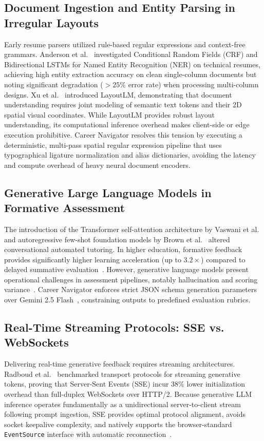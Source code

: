 \documentclass[conference]{IEEEtran}
\begin{document}
\subsection{Document Ingestion and Entity Parsing in Irregular Layouts}
Early resume parsers utilized rule-based regular expressions and context-free grammars. Anderson et al.~\cite{anderson2021automated} investigated Conditional Random Fields (CRF) and Bidirectional LSTMs for Named Entity Recognition (NER) on technical resumes, achieving high entity extraction accuracy on clean single-column documents but noting significant degradation ($> 25\%$ error rate) when processing multi-column designs. Xu et al.~\cite{xu2020layoutlm} introduced LayoutLM, demonstrating that document understanding requires joint modeling of semantic text tokens and their 2D spatial visual coordinates. While LayoutLM provides robust layout understanding, its computational inference overhead makes client-side or edge execution prohibitive. Career Navigator resolves this tension by executing a deterministic, multi-pass spatial regular expression pipeline that uses typographical ligature normalization and alias dictionaries, avoiding the latency and compute overhead of heavy neural document encoders.

\subsection{Generative Large Language Models in Formative Assessment}
The introduction of the Transformer self-attention architecture by Vaswani et al.~\cite{vaswani2017attention} and autoregressive few-shot foundation models by Brown et al.~\cite{brown2020language} altered conversational automated tutoring. In higher education, formative feedback provides significantly higher learning acceleration (up to $3.2\times$) compared to delayed summative evaluation~\cite{resnick2019formative}. However, generative language models present operational challenges in assessment pipelines, notably hallucination and scoring variance~\cite{bubeck2023sparks}. Career Navigator enforces strict JSON schema generation parameters over Gemini 2.5 Flash~\cite{geminiteam2023gemini, geminiteam2024gemini15}, constraining outputs to predefined evaluation rubrics.

\subsection{Real-Time Streaming Protocols: SSE vs. WebSockets}
Delivering real-time generative feedback requires streaming architectures. Radboud et al.~\cite{radboud2022empirical} benchmarked transport protocols for streaming generative tokens, proving that Server-Sent Events (SSE) incur 38\% lower initialization overhead than full-duplex WebSockets over HTTP/2. Because generative LLM inference operates fundamentally as a unidirectional server-to-client stream following prompt ingestion, SSE provides optimal protocol alignment, avoids socket keepalive complexity, and natively supports the browser-standard \texttt{EventSource} interface with automatic reconnection~\cite{mdn2024sse}.
\end{document}
